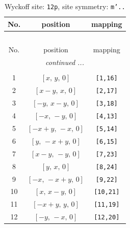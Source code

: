 \documentclass[fleqn,8pt]{jsarticle}
\begin{document}
\begin{longtable}{ccc}
\caption{Wyckoff site: {\tt 12p}, site symmetry: {\tt m'..}}
 \\
 \hline \hline
No. & position & mapping \\ \hline \endfirsthead

\multicolumn{2}{l}{\tablename\ \thetable{}} \\
 \hline \hline
No. & position & mapping \\ \hline \endhead

 \hline \hline
\multicolumn{2}{r}{\footnotesize\it continued ...} \\ \endfoot

 \hline \hline
\multicolumn{2}{r}{} \\ \endlastfoot

1 & $\left[ x,\, y,\, 0 \right]$ & {\tt [1,16]} \\ \hline
2 & $\left[ x - y,\, x,\, 0 \right]$ & {\tt [2,17]} \\ \hline
3 & $\left[ - y,\, x - y,\, 0 \right]$ & {\tt [3,18]} \\ \hline
4 & $\left[ - x,\, - y,\, 0 \right]$ & {\tt [4,13]} \\ \hline
5 & $\left[ - x + y,\, - x,\, 0 \right]$ & {\tt [5,14]} \\ \hline
6 & $\left[ y,\, - x + y,\, 0 \right]$ & {\tt [6,15]} \\ \hline
7 & $\left[ x - y,\, - y,\, 0 \right]$ & {\tt [7,23]} \\ \hline
8 & $\left[ y,\, x,\, 0 \right]$ & {\tt [8,24]} \\ \hline
9 & $\left[ - x,\, - x + y,\, 0 \right]$ & {\tt [9,22]} \\ \hline
10 & $\left[ x,\, x - y,\, 0 \right]$ & {\tt [10,21]} \\ \hline
11 & $\left[ - x + y,\, y,\, 0 \right]$ & {\tt [11,19]} \\ \hline
12 & $\left[ - y,\, - x,\, 0 \right]$ & {\tt [12,20]} \\
\end{longtable}
\renewcommand{\arraystretch}{1.2}
\end{document}
